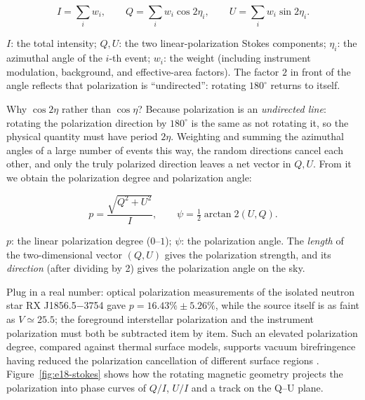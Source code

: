 \begin{equation}
  I=\sum_i w_i,\qquad
  Q=\sum_i w_i\cos 2\eta_i,\qquad
  U=\sum_i w_i\sin 2\eta_i .
  \label{eq:e18-stokes}
\end{equation}
\begin{formulaexplain}
\(I\): the total intensity; \(Q,U\): the two linear-polarization Stokes components; \(\eta_i\): the azimuthal angle of the \(i\)-th event; \(w_i\): the weight (including instrument modulation, background, and effective-area factors). The factor \(2\) in front of the angle reflects that polarization is ``undirected'': rotating \(180^\circ\) returns to itself.
\end{formulaexplain}

Why \(\cos2\eta\) rather than \(\cos\eta\)? Because polarization is an \emph{undirected line}: rotating the polarization direction by \(180^\circ\) is the same as not rotating it, so the physical quantity must have period \(2\eta\). Weighting and summing the azimuthal angles of a large number of events this way, the random directions cancel each other, and only the truly polarized direction leaves a net vector in \(Q,U\). From it we obtain the polarization degree and polarization angle:

\begin{equation}
  p=\frac{\sqrt{Q^2+U^2}}{I},\qquad
  \psi=\tfrac12\arctan2(U,Q).
  \label{eq:e18-pdop}
\end{equation}
\begin{formulaexplain}
\(p\): the linear polarization degree (\(0\)--\(1\)); \(\psi\): the polarization angle. The \emph{length} of the two-dimensional vector \((Q,U)\) gives the polarization strength, and its \emph{direction} (after dividing by 2) gives the polarization angle on the sky.
\end{formulaexplain}

Plug in a real number: optical polarization measurements of the isolated neutron star RX J1856.5\(-\)3754 gave \(p=16.43\%\pm5.26\%\), while the source itself is as faint as \(V\simeq25.5\); the foreground interstellar polarization and the instrument polarization must both be subtracted item by item. Such an elevated polarization degree, compared against thermal surface models, supports vacuum birefringence having reduced the polarization cancellation of different surface regions \citep{2015MNRAS.454.3254T,2016MNRAS.459.3585G,2017MNRAS.465..492M}. Figure~\ref{fig:e18-stokes} shows how the rotating magnetic geometry projects the polarization into phase curves of \(Q/I\), \(U/I\) and a track on the Q--U plane.

